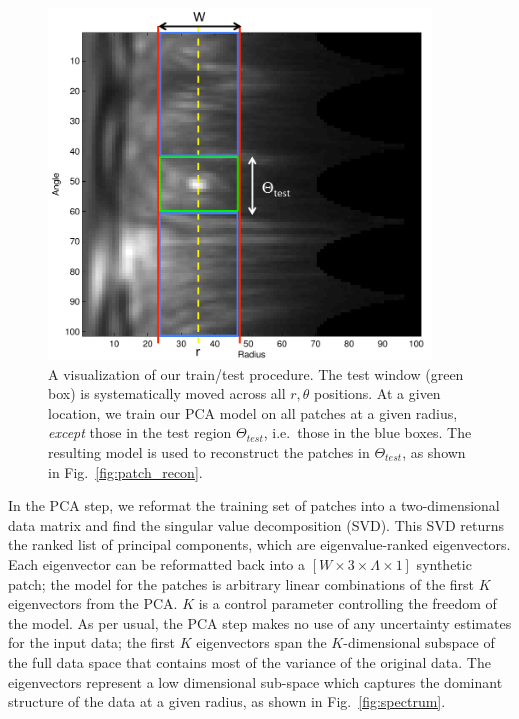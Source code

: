 \documentclass[12pt,pdftex,preprint]{aastex}
\newcommand{\fig}[1]{Fig.\ \ref{fig:#1}}
\begin{document}
\begin{figure}[h!]
\begin{center}
\includegraphics[width=4in]{figs/explain.pdf}
\end{center}
\vspace{-7mm}
\caption{A visualization of our train/test procedure. The test window
  (green box) is systematically moved across all $r,\theta$
  positions. At a given location, we train our PCA model on all
  patches at a given radius, {\em except} those in the test region
  $\Theta_{test}$, i.e.~those in the blue boxes. The resulting model
  is used to reconstruct the patches in $\Theta_{test}$, as shown in \fig{patch_recon}. }
\label{fig:traintest}
\end{figure}

In the PCA step, we reformat the training set of patches into a
two-dimensional data matrix and find the singular value decomposition
(SVD).  This SVD returns the ranked list of principal components,
which are eigenvalue-ranked eigenvectors.  Each eigenvector can be
reformatted back into a $[W\times 3\times\Lambda\times 1]$ synthetic
patch; the model for the patches is arbitrary linear combinations of
the first $K$ eigenvectors from the PCA.  $K$ is a control parameter
controlling the freedom of the model.  As per usual, the PCA step
makes no use of any uncertainty estimates for the input data; the
first $K$ eigenvectors span the $K$-dimensional subspace of the full
data space that contains most of the variance of the original data.
The eigenvectors represent a low dimensional sub-space which captures
the dominant structure of the data at a given radius, as shown in \fig{spectrum}.
\end{document}
